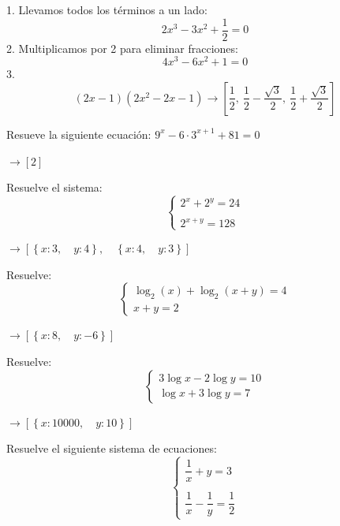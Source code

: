\documentclass[addpoints,spanish, 12pt,a4paper]{exam}
\begin{document}
\begin{questions}
\begin{solution}
1. Llevamos todos los términos a un lado:
   \[
   2x^3 - 3x^2 + \frac{1}{2} = 0
   \]
2. Multiplicamos por 2 para eliminar fracciones:
   \[
   4x^3 - 6x^2 + 1 = 0
   \]
3. $$\left(2 x - 1\right) \left(2 x^{2} - 2 x - 1\right) \to \left[ \frac{1}{2}, \  \frac{1}{2} - \frac{\sqrt{3}}{2}, \  \frac{1}{2} + \frac{\sqrt{3}}{2}\right]$$
\end{solution}

\question Resueve la siguiente ecuación:
$9^x - 6 \cdot {3^{x + 1}} + 81 = 0 $
\begin{solution}
    $\rightarrow \left [ 2\right ]$
\end{solution}

\question Resuelve el sistema:
$$\left\{\begin{matrix}{2^x} + {2^y} = 24\\ \\{2^{x + y}} = 128\end{matrix}\right. $$

\begin{solution}
    $\rightarrow \left [ \left \{ x : 3, \quad y : 4\right \}, \quad \left \{ x : 4, \quad y : 3\right \}\right ]$
\end{solution}

\question Resuelve:
$$\left\{\begin{matrix}\log_{2}(x) + \log_{2}(x + y) = 4\\x + y = 2 \end{matrix}\right. $$
\begin{solution}
    $\rightarrow \left [ \left \{ x : 8, \quad y : -6\right \}\right ]$
\end{solution}

\question Resuelve:
$$\left\{\begin{matrix}3\log x - 2\log y = 10\\\log x + 3\log y = 7\end{matrix}\right. $$

\begin{solution}
    $\rightarrow \left [ \left \{ x : 10000, \quad y : 10\right \}\right ]$
\end{solution}

\question Resuelve el siguiente sistema de ecuaciones:
\[
\begin{cases}
\dfrac{1}{x} + y = 3 \\ \\
\dfrac{1}{x} - \dfrac{1}{y} = \dfrac{1}{2}
\end{cases}
\]


\end{questions}
\end{document}
